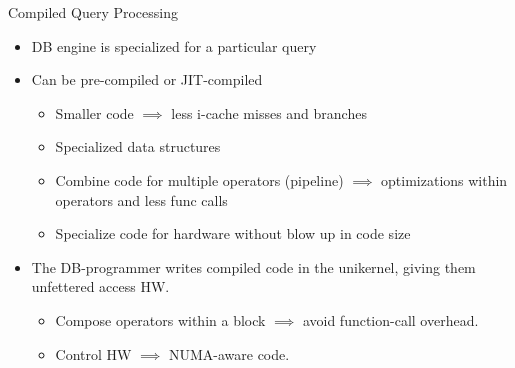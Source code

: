 
\begin{block}{Compiled Query Processing~\cite{SK16,N11}}
  \begin{itemize}
    \item DB engine is specialized for a particular query
    \item Can be pre-compiled or JIT-compiled
      \begin{itemize}
      \item Smaller code $\implies$ less i-cache misses and branches
      \item Specialized data structures
      \item Combine code for multiple operators (pipeline) $\implies$ optimizations within operators and less func calls
      \item Specialize code for hardware without blow up in code size
      \end{itemize}
    \item The DB-programmer writes compiled code in the unikernel, giving them unfettered access HW.
      \begin{itemize}
      \item Compose operators within a block $\implies$ avoid function-call overhead.
      \item Control HW $\implies$ NUMA-aware code.
      \end{itemize}
  \end{itemize}
\end{block}

